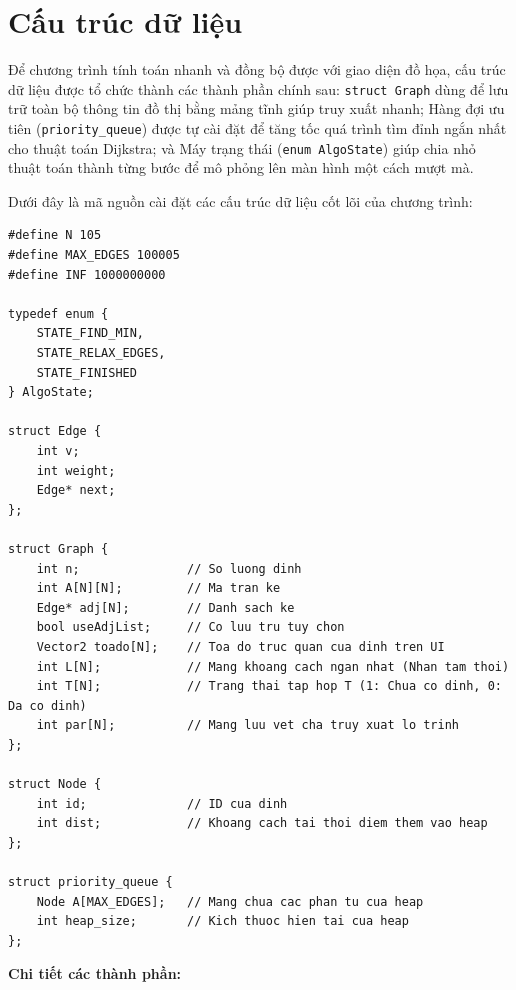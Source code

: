 \documentclass[12pt,a4paper,oneside]{report}
\begin{document}
\section{Cấu trúc dữ liệu}

Để chương trình tính toán nhanh và đồng bộ được với giao diện đồ họa, cấu trúc dữ liệu được tổ chức thành các thành phần chính sau: \texttt{struct Graph} dùng để lưu trữ toàn bộ thông tin đồ thị bằng mảng tĩnh giúp truy xuất nhanh; Hàng đợi ưu tiên (\texttt{priority\_queue}) được tự cài đặt để tăng tốc quá trình tìm đỉnh ngắn nhất cho thuật toán Dijkstra; và Máy trạng thái (\texttt{enum AlgoState}) giúp chia nhỏ thuật toán thành từng bước để mô phỏng lên màn hình một cách mượt mà.

Dưới đây là mã nguồn cài đặt các cấu trúc dữ liệu cốt lõi của chương trình:

\begin{lstlisting}[style=UserCStyle,title={Định nghĩa cấu trúc đồ thị, hàng đợi ưu tiên và máy trạng thái}, label={lst:datastruct}]
#define N 105
#define MAX_EDGES 100005
#define INF 1000000000

typedef enum { 
    STATE_FIND_MIN, 
    STATE_RELAX_EDGES, 
    STATE_FINISHED 
} AlgoState;

struct Edge {
    int v;
    int weight;
    Edge* next;
};

struct Graph {
    int n;               // So luong dinh
    int A[N][N];         // Ma tran ke
    Edge* adj[N];        // Danh sach ke
    bool useAdjList;     // Co luu tru tuy chon
    Vector2 toado[N];    // Toa do truc quan cua dinh tren UI
    int L[N];            // Mang khoang cach ngan nhat (Nhan tam thoi)
    int T[N];            // Trang thai tap hop T (1: Chua co dinh, 0: Da co dinh)
    int par[N];          // Mang luu vet cha truy xuat lo trinh
};

struct Node {
    int id;              // ID cua dinh
    int dist;            // Khoang cach tai thoi diem them vao heap
};

struct priority_queue {
    Node A[MAX_EDGES];   // Mang chua cac phan tu cua heap
    int heap_size;       // Kich thuoc hien tai cua heap
};
\end{lstlisting}

\vspace{0.5em}
\noindent\textbf{Chi tiết các thành phần:}
\end{document}
